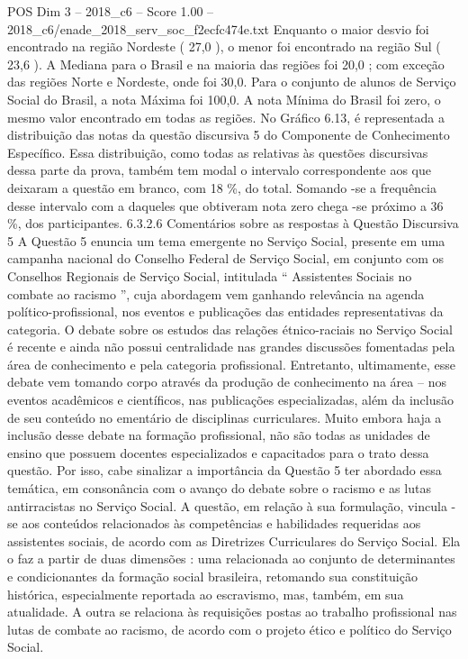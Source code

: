 \begin{textsample}{POS Dim 3 – 2018\_c6 – Score 1.00 – 2018\_c6/enade\_2018\_serv\_soc\_f2ecfc474e.txt}
Enquanto o maior desvio foi encontrado na região Nordeste ( 27,0 ), o menor foi encontrado na região Sul ( 23,6 ).
A Mediana para o Brasil e na maioria das regiões foi 20,0 ; com exceção das regiões Norte e Nordeste, onde foi 30,0.
Para o conjunto de alunos de Serviço Social do Brasil, a nota Máxima foi 100,0.
A nota Mínima do Brasil foi zero, o mesmo valor encontrado em todas as regiões.
No Gráfico 6.13, é representada a distribuição das notas da questão discursiva 5 do Componente de Conhecimento Específico.
Essa distribuição, como todas as relativas às questões discursivas dessa parte da prova, também tem modal o intervalo correspondente aos que deixaram a questão em branco, com 18 \%, do total.
Somando -se a frequência desse intervalo com a daqueles que obtiveram nota zero chega -se próximo a 36 \%, dos participantes. 6.3.2.6 Comentários sobre as respostas à Questão Discursiva 5 A Questão 5 enuncia um tema emergente no Serviço Social, presente em uma campanha nacional do Conselho Federal de Serviço Social, em conjunto com os Conselhos Regionais de Serviço Social, intitulada “ Assistentes Sociais no combate ao racismo ”, cuja abordagem vem ganhando relevância na agenda político-profissional, nos eventos e publicações das entidades representativas da categoria.
O debate sobre os estudos das relações étnico-raciais no Serviço Social é recente e ainda não possui centralidade nas grandes discussões fomentadas pela área de conhecimento e pela categoria profissional.
Entretanto, ultimamente, esse debate vem tomando corpo através da produção de conhecimento na área – nos eventos acadêmicos e científicos, nas publicações especializadas, além da inclusão de seu conteúdo no ementário de disciplinas curriculares.
Muito embora haja a inclusão desse debate na formação profissional, não são todas as unidades de ensino que possuem docentes especializados e capacitados para o trato dessa questão.
Por isso, cabe sinalizar a importância da Questão 5 ter abordado essa temática, em consonância com o avanço do debate sobre o racismo e as lutas antirracistas no Serviço Social.
A questão, em relação à sua formulação, vincula -se aos conteúdos relacionados às competências e habilidades requeridas aos assistentes sociais, de acordo com as Diretrizes Curriculares do Serviço Social.
Ela o faz a partir de duas dimensões : uma relacionada ao conjunto de determinantes e condicionantes da formação social brasileira, retomando sua constituição histórica, especialmente reportada ao escravismo, mas, também, em sua atualidade.
A outra se relaciona às requisições postas ao trabalho profissional nas lutas de combate ao racismo, de acordo com o projeto ético e político do Serviço Social.

\end{textsample}
